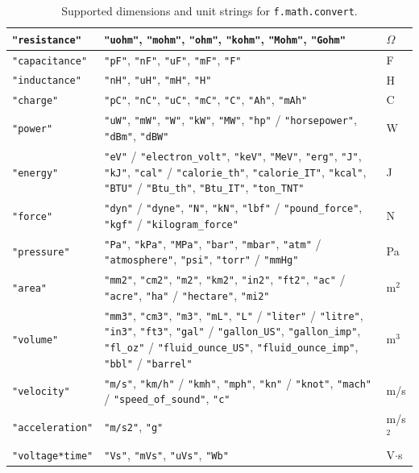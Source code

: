 \begin{table}[h]
\begin{tabular}{|l|p{10cm}|l|}
\hline
\texttt{"resistance"} & \texttt{"uohm"}, \texttt{"mohm"}, \texttt{"ohm"}, \texttt{"kohm"}, \texttt{"Mohm"}, \texttt{"Gohm"} & $\Omega$ \\
\hline
\texttt{"capacitance"} & \texttt{"pF"}, \texttt{"nF"}, \texttt{"uF"}, \texttt{"mF"}, \texttt{"F"} & F \\
\hline
\texttt{"inductance"} & \texttt{"nH"}, \texttt{"uH"}, \texttt{"mH"}, \texttt{"H"} & H \\
\hline
\texttt{"charge"} & \texttt{"pC"}, \texttt{"nC"}, \texttt{"uC"}, \texttt{"mC"}, \texttt{"C"}, \texttt{"Ah"}, \texttt{"mAh"} & C \\
\hline
\texttt{"power"} & \texttt{"uW"}, \texttt{"mW"}, \texttt{"W"}, \texttt{"kW"}, \texttt{"MW"}, \texttt{"hp"} / \texttt{"horsepower"}, \texttt{"dBm"}, \texttt{"dBW"} & W \\
\hline
\texttt{"energy"} & \texttt{"eV"} / \texttt{"electron\_volt"}, \texttt{"keV"}, \texttt{"MeV"}, \texttt{"erg"}, \texttt{"J"}, \texttt{"kJ"}, \texttt{"cal"} / \texttt{"calorie\_th"}, \texttt{"calorie\_IT"}, \texttt{"kcal"}, \texttt{"BTU"} / \texttt{"Btu\_th"}, \texttt{"Btu\_IT"}, \texttt{"ton\_TNT"} & J \\
\hline
\texttt{"force"} & \texttt{"dyn"} / \texttt{"dyne"}, \texttt{"N"}, \texttt{"kN"}, \texttt{"lbf"} / \texttt{"pound\_force"}, \texttt{"kgf"} / \texttt{"kilogram\_force"} & N \\
\hline
\texttt{"pressure"} & \texttt{"Pa"}, \texttt{"kPa"}, \texttt{"MPa"}, \texttt{"bar"}, \texttt{"mbar"}, \texttt{"atm"} / \texttt{"atmosphere"}, \texttt{"psi"}, \texttt{"torr"} / \texttt{"mmHg"} & Pa \\
\hline
\texttt{"area"} & \texttt{"mm2"}, \texttt{"cm2"}, \texttt{"m2"}, \texttt{"km2"}, \texttt{"in2"}, \texttt{"ft2"}, \texttt{"ac"} / \texttt{"acre"}, \texttt{"ha"} / \texttt{"hectare"}, \texttt{"mi2"} & m$^2$ \\
\hline
\texttt{"volume"} & \texttt{"mm3"}, \texttt{"cm3"}, \texttt{"m3"}, \texttt{"mL"}, \texttt{"L"} / \texttt{"liter"} / \texttt{"litre"}, \texttt{"in3"}, \texttt{"ft3"}, \texttt{"gal"} / \texttt{"gallon\_US"}, \texttt{"gallon\_imp"}, \texttt{"fl\_oz"} / \texttt{"fluid\_ounce\_US"}, \texttt{"fluid\_ounce\_imp"}, \texttt{"bbl"} / \texttt{"barrel"} & m$^3$ \\
\hline
\texttt{"velocity"} & \texttt{"m/s"}, \texttt{"km/h"} / \texttt{"kmh"}, \texttt{"mph"}, \texttt{"kn"} / \texttt{"knot"}, \texttt{"mach"} / \texttt{"speed\_of\_sound"}, \texttt{"c"} & m/s \\
\hline
\texttt{"acceleration"} & \texttt{"m/s2"}, \texttt{"g"} & m/s$^2$ \\
\hline
\texttt{"voltage*time"} & \texttt{"Vs"}, \texttt{"mVs"}, \texttt{"uVs"}, \texttt{"Wb"} & V$\cdot$s \\
\hline
\end{tabular}
\caption{Supported dimensions and unit strings for \texttt{f.math.convert}.}
\label{tab:unit-strings}
\end{table}

